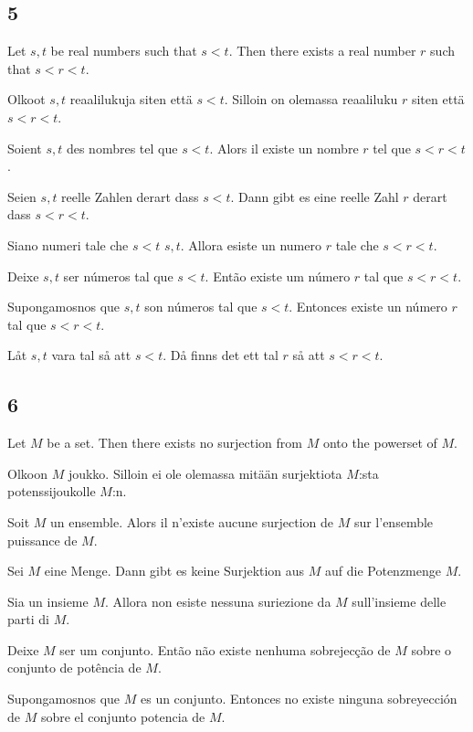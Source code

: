 \documentclass{article}
\begin{document}
\subsection*{5}

Let $ s, t $ be real numbers such that $ s < t $. Then there exists a real number $ r $ such that $ s < r < t $.

Olkoot $ s, t $ reaalilukuja siten että $ s < t $. Silloin on olemassa reaaliluku $ r $ siten että $ s < r < t $.

Soient $ s, t $ des nombres tel que $ s < t $. Alors il existe un nombre $ r $ tel que $ s < r < t $.

Seien $ s, t $ reelle Zahlen derart dass $ s < t $. Dann gibt es eine reelle Zahl $ r $ derart dass $ s < r < t $.

Siano numeri tale che $ s < t $ $ s, t $. Allora esiste un numero $ r $ tale che $ s < r < t $.

Deixe $ s, t $ ser números tal que $ s < t $. Então existe um número $ r $ tal que $ s < r < t $.

Supongamosnos que $ s, t $ son números tal que $ s < t $. Entonces existe un número $ r $ tal que $ s < r < t $.

Låt $ s, t $ vara tal så att $ s < t $. Då finns det ett tal $ r $ så att $ s < r < t $.

\subsection*{6}

Let $ M $ be a set. Then there exists no surjection from $ M $ onto the powerset of $ M $.

Olkoon $ M $ joukko. Silloin ei ole olemassa mitään surjektiota $ M $:sta potenssijoukolle $ M $:n.

Soit $ M $ un ensemble. Alors il n'existe aucune surjection de $ M $ sur l'ensemble puissance de $ M $.

Sei $ M $ eine Menge. Dann gibt es keine Surjektion aus $ M $ auf die Potenzmenge $ M $.

Sia un insieme $ M $. Allora non esiste nessuna suriezione da $ M $ sull'insieme delle parti di $ M $.

Deixe $ M $ ser um conjunto. Então não existe nenhuma sobrejecção de $ M $ sobre o conjunto de potência de $ M $.

Supongamosnos que $ M $ es un conjunto. Entonces no existe ninguna sobreyección de $ M $ sobre el conjunto potencia de $ M $.
\end{document}
